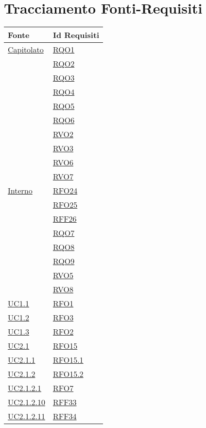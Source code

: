 \section{Tracciamento Fonti-Requisiti}
\normalsize
\begin{longtable}{|>{\centering}m{5cm}|m{5cm}<{\centering}|}
	\hline
	\textbf{Fonte} & \textbf{Id Requisiti}\\
	\hline
	\endhead
	\hyperlink{Capitolato}{Capitolato} & \hyperlink{RQO1}{RQO1}\\
	& \hyperlink{RQO2}{RQO2}\\
	& \hyperlink{RQO3}{RQO3}\\
	& \hyperlink{RQO4}{RQO4}\\
	& \hyperlink{RQO5}{RQO5}\\
	& \hyperlink{RQO6}{RQO6}\\
	& \hyperlink{RVO2}{RVO2}\\
	& \hyperlink{RVO3}{RVO3}\\
	& \hyperlink{RVO6}{RVO6}\\
	& \hyperlink{RVO7}{RVO7}\\ \hline
	\hyperlink{Interno}{Interno} & \hyperlink{RFO24}{RFO24}\\
	& \hyperlink{RFO25}{RFO25}\\
	& \hyperlink{RFF26}{RFF26}\\
	& \hyperlink{RQO7}{RQO7}\\
	& \hyperlink{RQO8}{RQO8}\\
	& \hyperlink{RQO9}{RQO9}\\
	& \hyperlink{RVO5}{RVO5}\\
	& \hyperlink{RVO8}{RVO8}\\ \hline
	\hyperlink{UC1.1}{UC1.1} & \hyperlink{RFO1}{RFO1}\\ \hline
	\hyperlink{UC1.2}{UC1.2} & \hyperlink{RFO3}{RFO3}\\ \hline
	\hyperlink{UC1.3}{UC1.3} & \hyperlink{RFO2}{RFO2}\\ \hline
	\hyperlink{UC2.1}{UC2.1} & \hyperlink{RFO15}{RFO15}\\ \hline
	\hyperlink{UC2.1.1}{UC2.1.1} & \hyperlink{RFO15.1}{RFO15.1}\\ \hline
	\hyperlink{UC2.1.2}{UC2.1.2} & \hyperlink{RFO15.2}{RFO15.2}\\ \hline
	\hyperlink{UC2.1.2.1}{UC2.1.2.1} & \hyperlink{RFO7}{RFO7}\\ \hline
	\hyperlink{UC2.1.2.10}{UC2.1.2.10} & \hyperlink{RFF33}{RFF33}\\ \hline
	\hyperlink{UC2.1.2.11}{UC2.1.2.11} & \hyperlink{RFF34}{RFF34}\\ \hline

\end{longtable}
